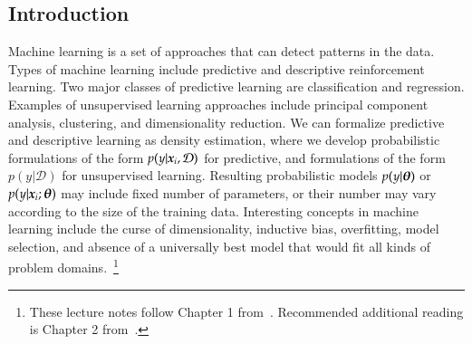 \begin{refsection}
\chapter{Introduction}

\begin{summary}
Machine learning is a set of approaches that can detect patterns in the data. Types of machine learning include predictive and descriptive reinforcement learning. Two major classes of predictive learning are classification and regression. Examples of unsupervised learning approaches include principal component analysis, clustering, and dimensionality reduction. We can formalize predictive and descriptive learning as density estimation, where we develop probabilistic formulations of the form $p(y|\boldsymbol{x}_i,\mathcal{D})$ for predictive, and formulations of the form $p(y|\mathcal{D})$ for unsupervised learning. Resulting probabilistic models $p(y|\boldsymbol{\theta})$ or $p(y|\boldsymbol{x}_i; \boldsymbol{\theta})$ may include fixed number of parameters, or their number may vary according to the size of the training data. Interesting concepts in machine learning include the curse of dimensionality, inductive bias, overfitting, model selection, and absence of a universally best model that would fit all kinds of problem domains.~\footnote{These lecture notes follow Chapter 1 from~\citet{2012-Murphy}. Recommended additional reading is Chapter 2 from~\citet{ESL}.}
\end{summary}



\end{refsection}

